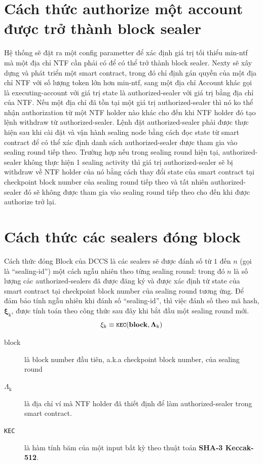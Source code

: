 \documentclass[12pt,oneside]{amsart}
\begin{document}
\begin{multicols}{2}
\section{Cách thức authorize một account được trở thành block sealer}
Hệ thống sẽ đặt ra một config parametter để xác định giá trị tối thiểu min-ntf mà một địa chỉ NTF cần phải có để có thể trở thành block sealer.
Nexty sẽ xây dựng và phát triển một smart contract, trong đó chỉ định gán quyền của một địa chỉ NTF với số lượng token lớn hơn min-ntf, sang một địa chỉ Account khác gọi là executing-account với giá trị state là authorized-sealer với giá trị bằng địa chỉ của NTF. Nếu một địa chỉ đã tồn tại một giá trị authorized-sealer thì nó ko thể nhận authorization từ một NTF holder nào khác cho đến khi NTF holder đó tạo lệnh withdraw từ authorized-sealer. Lệnh đặt authorized-sealer phải được thực hiện sau khi cài đặt và vận hành sealing node bằng cách đọc state từ smart contract để có thể xác định danh sách authorized-sealer được tham gia vào sealing round tiếp theo. Trường hợp nếu trong sealing round hiện tại, authorized-sealer không thực hiện 1 sealing activity thì giá trị authorized-sealer sẽ bị withdraw về NTF holder của nó bằng cách thay đổi state của smart contract tại checkpoint block number của sealing round tiếp theo và tất nhiên authorized-sealer đó sẽ không được tham gia vào sealing round tiếp theo cho đến khi được authorize trở lại.

\section{Cách thức các sealers đóng block}
Cách thức đóng Block của DCCS là các sealers sẽ được đánh số từ $1$ đến $n$ (gọi là ``sealing-id'') một cách ngẫu nhiên theo từng sealing round: trong đó $n$ là số lượng các authorized-sealers đã được đăng ký và được xác định từ state của smart contract tại checkpoint block number của sealing round tương ứng. Để đảm bảo tính ngẫu nhiên khi đánh số ``sealing-id'', thì việc đánh số theo mã hash, $\boldsymbol{\xi_{\mathrm{k}}}$, được tính toán theo công thức sau đây khi bắt đầu một sealing round mới. 
\begin{equation}
\xi_{\mathrm{k}} \equiv \texttt{\small KEC}(\mathbf{block}, \mathbf{\Lambda_{\mathrm{k}}})
\end{equation}

\begin{description}
\item[block] là block number đầu tiên, a.k.a checkpoint block number, của sealing round
\item[$\Lambda_{\mathrm{k}}$] là địa chỉ ví mà NTF holder đã thiết định để làm authorized-sealer trong smart contract.
\item[\texttt{\small KEC}] là hàm tính băm của một input bất kỳ theo thuật toán \textbf{SHA-3 Keccak-512}.
\end{description}


\end{multicols}
\end{document}
